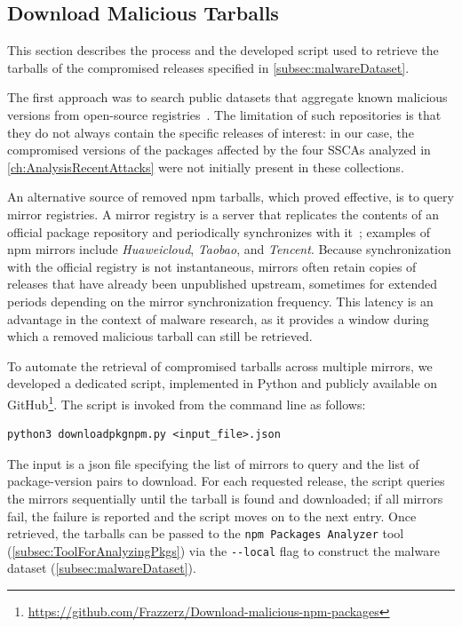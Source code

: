 \subsection{Download Malicious Tarballs}
\label{subsec:DownloadMaliciousTarballs}

This section describes the process and the developed script used to retrieve the tarballs
of the compromised releases specified in \cref{subsec:malwareDataset}.

The first approach was to search public datasets that aggregate known malicious versions from open-source registries~\cite{OpenSourceDatasetMaliciousSoftwarePackages}. 
The limitation of such repositories is that they do not always contain the specific releases of interest: 
in our case, the compromised versions of the packages affected by the four
\acp{SSCA} analyzed in \cref{ch:AnalysisRecentAttacks} were not initially present in these collections.

An alternative source of removed \ac{npm} tarballs, which proved effective, is to query mirror registries. 
A mirror registry is a server that replicates the contents of an official package repository 
and periodically synchronizes with it~\cite{guo2023empiricalstudymaliciouscode};
examples of \ac{npm} mirrors include \emph{Huaweicloud}, \emph{Taobao}, and \emph{Tencent}.
Because synchronization with the official registry is not instantaneous, 
mirrors often retain copies of releases that have already been unpublished upstream, 
sometimes for extended periods depending on the mirror synchronization frequency. 
This latency is an advantage in the context of malware research, 
as it provides a window during which a removed malicious tarball can still be retrieved.

To automate the retrieval of compromised tarballs across multiple mirrors, 
we developed a dedicated script, 
implemented in Python and publicly available on GitHub\footnote{\url{https://github.com/Frazzerz/Download-malicious-npm-packages}}. 
The script is invoked from the command line as follows:
\begin{verbatim}
python3 downloadpkgnpm.py <input_file>.json
\end{verbatim}
The input is a json file specifying the list of mirrors to query and the list of package-version pairs to download. 
For each requested release, the script queries the mirrors sequentially until the tarball is found and downloaded; 
if all mirrors fail, the failure is reported and the script moves on to the next entry. 
Once retrieved, the tarballs can be passed to the \texttt{npm Packages Analyzer} tool (\cref{subsec:ToolForAnalyzingPkgs}) 
via the \texttt{-{}-local} flag to construct the malware dataset (\cref{subsec:malwareDataset}).